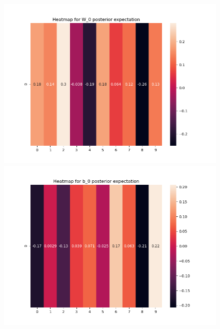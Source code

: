 \documentclass[10pt]{homeworg}
\begin{document}
\begin{figure}[!htbp]
    \centering
    \begin{minipage}{0.45\textwidth}
        \centering
       \includegraphics[scale=0.5]{figures/heatmap_exp_W_0.png}
    \end{minipage}\hfill
    \begin{minipage}{0.45\textwidth}
        \centering
        \includegraphics[scale=0.5]{figures/heatmap_exp_b_0.png}
    \end{minipage}
\end{figure}
\end{document}
